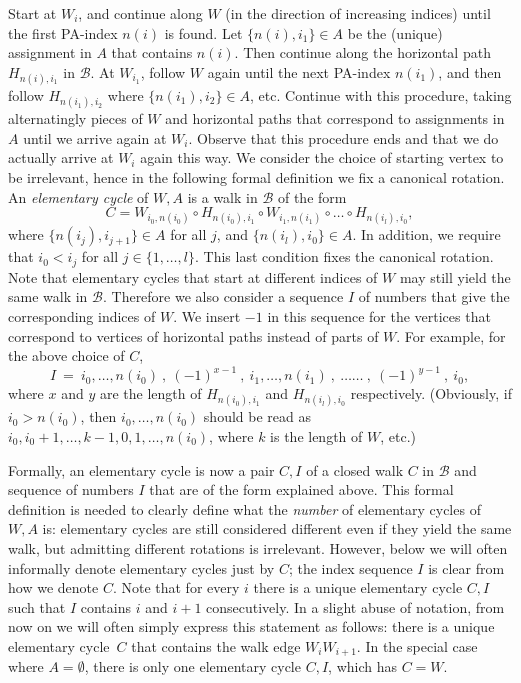 \documentclass{llncs}
\def\term#1{{\em #1}\marginpar{\raggedright{\small\it #1}}}
\newcommand{\BW}{\mathcal{B}}
\newcommand{\elcyc}{elementary cycle}
\begin{document}
 
Start at $W_i$, and continue along $W$ (in the direction of increasing indices) until the first PA-index $n(i)$ is found. Let $\{n(i),i_1\}\in A$ be the (unique) assignment in $A$ that contains $n(i)$. Then continue along the horizontal path $H_{n(i),i_1}$ in $\BW$. At $W_{i_1}$, follow $W$ again until the next PA-index $n(i_1)$, and then follow $H_{n(i_1),i_2}$ where $\{n(i_1),i_2\}\in A$, etc. Continue with this procedure, taking alternatingly pieces of $W$ and horizontal paths that correspond to assignments in $A$ until we arrive again at $W_i$. 
Observe that this procedure ends and that we do actually arrive at $W_i$ again this way. We consider the choice of starting vertex to be irrelevant, hence in the following formal definition we fix a canonical rotation.
An \term{elementary cycle} of $W,A$ is a walk in $\BW$ of the form
\[
C=W_{i_0,n(i_0)} \circ H_{n(i_0),i_1} \circ W_{i_1,n(i_1)} \circ \ldots \circ H_{n(i_l),i_0},
\]
where $\{n(i_j),i_{j+1}\}\in A$ for all $j$, and $\{n(i_l),i_0\}\in A$. In addition, we require that $i_0<i_j$ for all $j\in \{1,\ldots,l\}$. This last condition fixes the canonical rotation. 
Note that elementary cycles that start at different indices of $W$ may still yield the same walk in $\BW$.
Therefore we also consider a sequence $I$ of numbers that give the corresponding indices of $W$. We insert $-1$ in this sequence for the vertices that correspond to vertices of horizontal paths instead of parts of $W$. For example, for the above choice of $C$,
\[
I\ =\ i_0,\ldots,n(i_0)\ ,\ (-1)^{x-1}\ ,\ i_1,\ldots,n(i_1)\ ,\ \ldots\ldots\ ,\ (-1)^{y-1}\ ,\ i_0,
\]
where $x$ and $y$ are the length of $H_{n(i_0),i_1}$ and $H_{n(i_l),i_0}$ respectively. 
 (Obviously, if $i_0>n(i_0)$, then $i_0,\ldots,n(i_0)$ should be read as $i_0,i_0+1,\ldots,k-1,0,1,\ldots,n(i_0)$, where $k$ is the length of $W$, etc.)

Formally, an elementary cycle is now a pair $C,I$ of a closed walk $C$ in $\BW$ and sequence of numbers $I$ that are of the form explained above. 
This formal definition is needed to clearly define what the {\em number} of elementary cycles of $W,A$ is: elementary cycles are still considered different even if they yield the same walk, but admitting different rotations is irrelevant.
However, below we will often informally denote elementary cycles just by $C$; the index sequence $I$ is clear from how we denote $C$. 
Note that for every $i$ there is a unique elementary cycle $C,I$ such that $I$ contains $i$ and $i+1$ consecutively. In a slight abuse of notation, from now on we will often simply express this statement as follows: there is a unique \elcyc\ $C$ that contains the walk edge $W_iW_{i+1}$.
In the special case where $A=\emptyset$, there is only one elementary cycle $C,I$, which has $C=W$.
\end{document}
